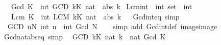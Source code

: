 \begin{isabellebody}
\ \ \ {\isachardoublequoteopen}Gcd\ K\ {\isacharequal}{\kern0pt}\ int\ {\isacharparenleft}{\kern0pt}GCD\ k{\isasymin}K{\isachardot}{\kern0pt}\ {\isacharparenleft}{\kern0pt}nat\ {\isasymcirc}\ abs{\isacharparenright}{\kern0pt}\ k{\isacharparenright}{\kern0pt}{\isachardoublequoteclose}\isanewline
\isanewline
{}\isamarkupfalse%
\ Lcm{\isacharunderscore}{\kern0pt}int\ {\isacharcolon}{\kern0pt}{\isacharcolon}{\kern0pt}\ {\isachardoublequoteopen}int\ set\ {\isasymRightarrow}\ int{\isachardoublequoteclose}\isanewline
\ \ \ {\isachardoublequoteopen}Lcm\ K\ {\isacharequal}{\kern0pt}\ int\ {\isacharparenleft}{\kern0pt}LCM\ k{\isasymin}K{\isachardot}{\kern0pt}\ {\isacharparenleft}{\kern0pt}nat\ {\isasymcirc}\ abs{\isacharparenright}{\kern0pt}\ k{\isacharparenright}{\kern0pt}{\isachardoublequoteclose}\isanewline
\isanewline
{}\isamarkupfalse%
%
\isadelimproof
\ %
\endisadelimproof
%
\isatagproof
\isacommand{{\isachardot}{\kern0pt}{\isachardot}{\kern0pt}}\isamarkupfalse%
%
\endisatagproof
{\isafoldproof}%
%
\isadelimproof
%
\endisadelimproof
\isanewline
\isanewline
{}\isamarkupfalse%
\isanewline
\isanewline
{}\isamarkupfalse%
\ Gcd{\isacharunderscore}{\kern0pt}int{\isacharunderscore}{\kern0pt}eq\ {\isacharbrackleft}{\kern0pt}simp{\isacharbrackright}{\kern0pt}{\isacharcolon}{\kern0pt}\isanewline
\ \ {\isachardoublequoteopen}{\isacharparenleft}{\kern0pt}GCD\ n{\isasymin}N{\isachardot}{\kern0pt}\ int\ n{\isacharparenright}{\kern0pt}\ {\isacharequal}{\kern0pt}\ int\ {\isacharparenleft}{\kern0pt}Gcd\ N{\isacharparenright}{\kern0pt}{\isachardoublequoteclose}\isanewline
%
\isadelimproof
\ \ %
\endisadelimproof
%
\isatagproof
{}\isamarkupfalse%
\ {\isacharparenleft}{\kern0pt}simp\ add{\isacharcolon}{\kern0pt}\ Gcd{\isacharunderscore}{\kern0pt}int{\isacharunderscore}{\kern0pt}def\ image{\isacharunderscore}{\kern0pt}image{\isacharparenright}{\kern0pt}%
\endisatagproof
{\isafoldproof}%
%
\isadelimproof
\isanewline
%
\endisadelimproof
\isanewline
{}\isamarkupfalse%
\ Gcd{\isacharunderscore}{\kern0pt}nat{\isacharunderscore}{\kern0pt}abs{\isacharunderscore}{\kern0pt}eq\ {\isacharbrackleft}{\kern0pt}simp{\isacharbrackright}{\kern0pt}{\isacharcolon}{\kern0pt}\isanewline
\ \ {\isachardoublequoteopen}{\isacharparenleft}{\kern0pt}GCD\ k{\isasymin}K{\isachardot}{\kern0pt}\ nat\ {\isasymbar}k{\isasymbar}{\isacharparenright}{\kern0pt}\ {\isacharequal}{\kern0pt}\ nat\ {\isacharparenleft}{\kern0pt}Gcd\ K{\isacharparenright}{\kern0pt}{\isachardoublequoteclose}\isanewline

\end{isabellebody}
